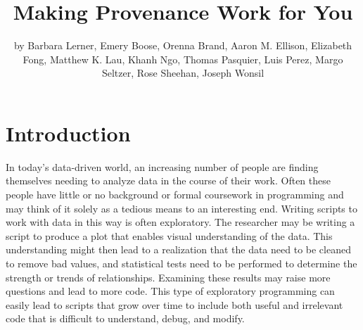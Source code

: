 \title{Making Provenance Work for You}
\author{by Barbara Lerner, Emery Boose, Orenna Brand, Aaron M. Ellison, Elizabeth Fong, Matthew K. Lau, Khanh Ngo, Thomas Pasquier, Luis Perez, Margo Seltzer, Rose Sheehan, Joseph Wonsil}

\maketitle



\section{Introduction}


In today's data-driven world, an increasing number of people are finding themselves needing to analyze data in the course of their work. Often these people have little or no background or formal coursework in programming and may think of it solely as a tedious means to an interesting end.  Writing scripts to work with data in this way is often exploratory.  The researcher may be writing a script to produce a plot that enables visual understanding of the data. This understanding might then lead to a realization that the data need to be cleaned to remove bad values, and statistical tests need to be performed to determine the strength or trends of relationships.  Examining these results may raise more questions and lead to more code.  This type of exploratory programming can easily lead to scripts that grow over time to include both useful and irrelevant code that is difficult to understand, debug, and modify.

